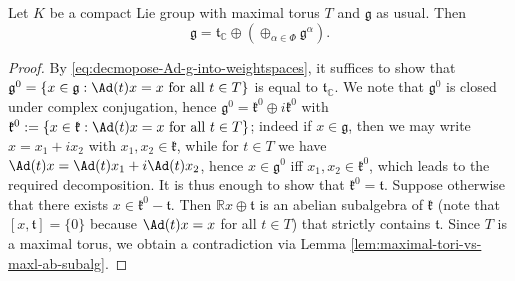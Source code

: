 \documentclass[reqno]{amsart} 
\begin{document}
\begin{lemma}
  Let $K$ be a compact Lie group with maximal torus $T$ and $\mathfrak{g}$ as usual.  Then
  \begin{equation}\label{eq:root-space-decomp}
    \mathfrak{g} = \mathfrak{t}_{\mathbb{C}} \oplus (\oplus_{\alpha \in \Phi} \mathfrak{g}^{\alpha}).
  \end{equation}
\end{lemma}
\begin{proof}
  By \eqref{eq:decmopose-Ad-g-into-weightspaces}, it suffices to show that $\mathfrak{g}^0 = \{x \in \mathfrak{g} : \Ad(t) x = x \text{ for all } t \in T\}$ is equal to $\mathfrak{t}_{\mathbb{C}}$.  We note that $\mathfrak{g}^0$ is closed under complex conjugation, hence $\mathfrak{g}^0 = \mathfrak{k}^0 \oplus i \mathfrak{k}^0$ with $\mathfrak{k}^0 := \{x \in \mathfrak{k} : \Ad(t) x = x \text{ for all } t \in T\}$; indeed if $x \in \mathfrak{g}$, then we may write $x = x_1 + i x_2$ with $x_1,x_2 \in \mathfrak{k}$, while for $t \in T$ we have $\Ad(t) x = \Ad(t) x_1 + i \Ad(t) x_2$, hence $x \in \mathfrak{g}^0$ iff $x_1,x_2 \in \mathfrak{k}^0$, which leads to the required decomposition.  It is thus enough to show that $\mathfrak{k}^0 = \mathfrak{t}$.  Suppose otherwise that there exists $x \in \mathfrak{k}^0 - \mathfrak{t}$.  Then $\mathbb{R} x \oplus \mathfrak{t}$ is an abelian subalgebra of $\mathfrak{k}$ (note that $[x,\mathfrak{t}] = \{0\}$ because $\Ad(t) x = x$ for all $t \in T$) that strictly contains $\mathfrak{t}$.  Since $T$ is a maximal torus, we obtain a contradiction via Lemma \ref{lem:maximal-tori-vs-maxl-ab-subalg}.
\end{proof}
\end{document}
